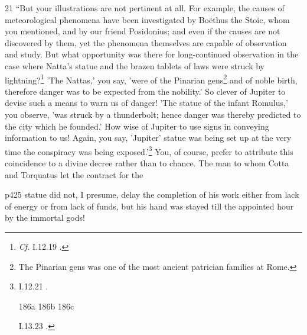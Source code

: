 21
``But your illustrations are not pertinent at all. For example, the causes of meteorological phenomena have been investigated by Boëthus\texthebrew{} the Stoic, whom you mentioned, and by our friend Posidonius; and even if the causes are not discovered by them, yet the phenomena themselves are capable of observation and study. But what opportunity was there for long-continued observation in the case where Natta's statue and the brazen tablets of laws were struck by lightning?\texthebrew{}\footnote{\emph{Cf.}
I.12.19 .

} 'The Nattas,' you say, 'were of the Pinarian gens\texthebrew{}\footnote{The Pinarian gens was one of the most ancient patrician families at Rome.

} and of noble birth, therefore danger was to be expected from the nobility.' So clever of Jupiter to devise such a means to warn us of danger! 'The statue of the infant Romulus,' you observe, 'was struck by a thunderbolt; hence danger was thereby predicted to the city which he founded.' How wise of Jupiter to use signs in conveying information to us! Again, you say, 'Jupiter' statue was being set up at the very time the conspiracy was being exposed.'\texthebrew{}\footnote{I.12.21 .



186a
186b
186c

I.13.23 .

} You, of course, prefer to attribute this coincidence to a divine decree rather than to chance. The man to whom Cotta and Torquatus let the contract for the

p425 statue did not, I presume, delay the completion of his work either from lack of energy or from lack of funds, but his hand was stayed till the appointed hour by the immortal gods!

